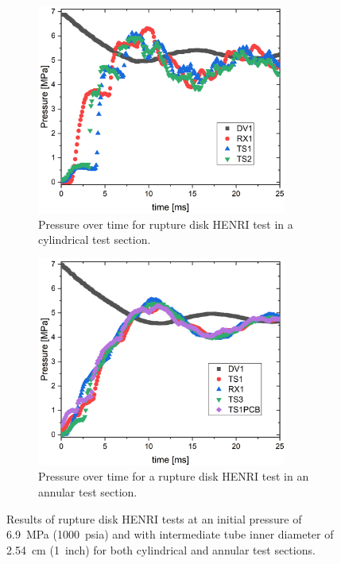 \begin{figure}[bt]
    \vspace{16pt}
    \centering
    \begin{subfigure}[t]{0.45\textwidth}
        \centering
        \includegraphics[width=0.9\textwidth]{results/plots/BurstDiskTest_1inch.png}
        \caption{Pressure over time for rupture disk HENRI test in a cylindrical test section.}
        \label{fig:cyl disk}
    \end{subfigure}
    \hfill
    \begin{subfigure}[t]{0.45\textwidth}
        \centering
        \includegraphics[width=0.9\textwidth]{results/plots/1000psi_annular_disk.png}
        \caption{Pressure over time for a rupture disk HENRI test in an annular test section.}
        \label{fig:ann disk}
    \end{subfigure}
    
    \caption{Results of rupture disk HENRI tests at an initial pressure of \SI{6.9}{\mega\pascal} (\SI{1000}{psia}) and with intermediate tube inner diameter of \SI{2.54}{\centi\meter} (\SI{1}{inch}) for both cylindrical and annular test sections.}
    \label{fig:disk}
    \vspace{16pt}
\end{figure}

